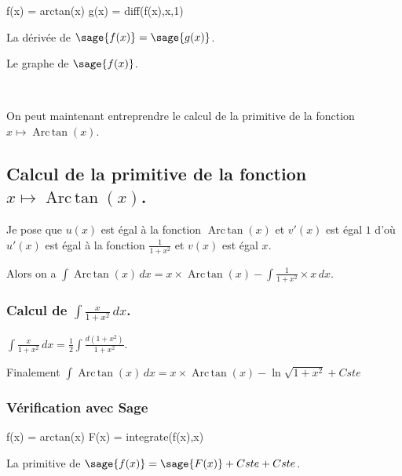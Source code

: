 \documentclass[a4paper,14pt]{extreport} %
\renewcommand{\arctan}{\mathop{\mathrm{Arc\,tan}}}
\begin{document}
\begin{sageblock}
    f(x) = arctan(x)
    g(x) = diff(f(x),x,1)
\end{sageblock}

La dérivée de $\sage{f(x)} = \sage{g(x)} $.

Le graphe de $\sage{f(x)} $.


\begin{center}
 \\
\end{center}




On peut maintenant entreprendre le calcul de la primitive de la  fonction  $x \mapsto \arctan(x) $.



\subsection{Calcul de la primitive de la fonction  $x \mapsto \arctan(x) $.}



Je pose que $u(x)$  est égal à la fonction $\arctan(x)$ et $v'(x)$ est égal $1$  d'où $u'(x)$  est égal à la fonction $ \frac{1}{1+ x^2} $ et $v(x)$ est égal $x$.

Alors on a $\int \arctan(x) \, dx = x \times \arctan(x) -\int \frac{1}{1+x^2} \times x \, dx $.






\subsubsection{Calcul de $\int \frac{x}{1+ x^2} \, dx $.}

$\int \frac{x}{1+ x^2} \, dx = \frac{1}{2} \int \frac{d(1+x^2)}{1+ x^2} $.


Finalement $\int \arctan(x) \, dx = x \times \arctan(x) -\ln{ \sqrt{1+ x^2}} + Cste $

\subsubsection{Vérification avec Sage}

\begin{sageblock}
    f(x) = arctan(x)
    F(x) = integrate(f(x),x)
\end{sageblock}

La primitive de $\sage{f(x)} = \sage{F(x)} + Cste + Cste $.
\end{document}
